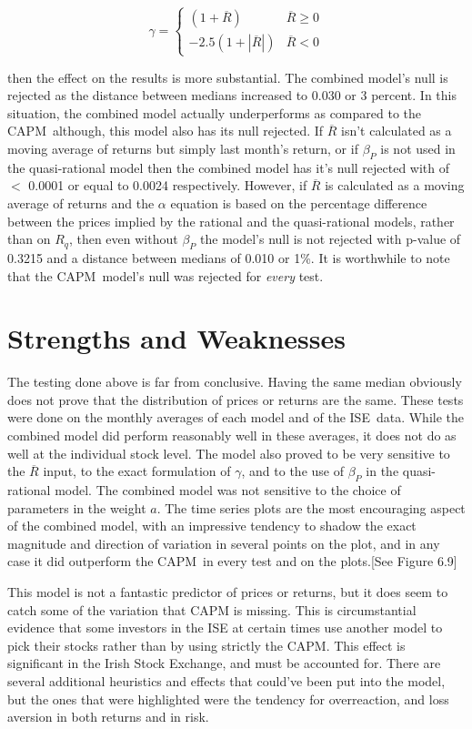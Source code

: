 \documentclass{ucthesis}
\begin{document}
\[
\gamma =\left\{ 
\begin{array}{cc}
(1+\overline{R}) & \overline{R}\geq 0 \\ 
-2.5\left( 1+\left\vert \overline{R}\right\vert \right) & \overline{R}<0%
\end{array}%
\right. 
\]

then the effect on the results is more substantial. The combined model's
null is rejected as the distance between medians increased to 0.030 or 3
percent. In this situation, the combined model actually underperforms as
compared to the CAPM\ although, this model also has its null rejected. If $%
\overline{R}$ isn't calculated as a moving average of returns but simply
last month's return, or if $\beta _{P}$ is not used in the quasi-rational
model then the combined model has it's null rejected with of $<$ 0.0001 or
equal to 0.0024 respectively. However, if $\overline{R}$ is calculated as a
moving average of returns and the $\alpha $ equation is based on the
percentage difference between the prices implied by the rational and the
quasi-rational models, rather than on $R_{q}$, then even without $\beta _{P}$
the model's null is not rejected with p-value of 0.3215 and a distance
between medians of 0.010 or 1\%. It is worthwhile to note that the CAPM\
model's null was rejected for \textit{every }test.

\section{Strengths and Weaknesses}

The testing done above is far from conclusive. Having the same median
obviously does not prove that the distribution of prices or returns are the
same. These tests were done on the monthly averages of each model and of the
ISE\ data. While the combined model did perform reasonably well in these
averages, it does not do as well at the individual stock level. The model
also proved to be very sensitive to the $\overline{R}$ input, to the exact
formulation of $\gamma $, and to the use of $\beta _{P}$ in the
quasi-rational model. The combined model was not sensitive to the choice of
parameters in the weight $a$. The time series plots are the most encouraging
aspect of the combined model, with an impressive tendency to shadow the
exact magnitude and direction of variation in several points on the plot,
and in any case it did outperform the CAPM\ in every test and on the
plots.[See Figure 6.9]

This model is not a fantastic predictor of prices or returns, but it does
seem to catch some of the variation that CAPM is missing. This is
circumstantial evidence that some investors in the ISE at certain times use
another model to pick their stocks rather than by using strictly the CAPM.
This effect is significant in the Irish Stock Exchange, and must be
accounted for. There are several additional heuristics and effects that
could've been put into the model, but the ones that were highlighted were
the tendency for overreaction, and loss aversion in both returns and in risk.
\end{document}

